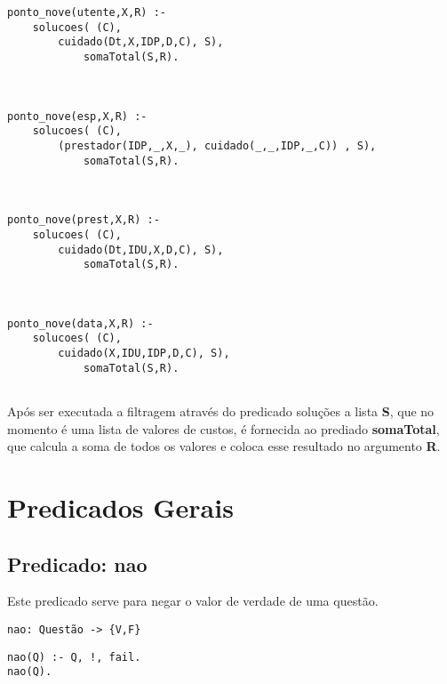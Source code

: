\documentclass{report}
\def\titulo#1{\section{#1}}
\begin{document}
\begin{verbatim}
ponto_nove(utente,X,R) :- 
    solucoes( (C), 
        cuidado(Dt,X,IDP,D,C), S), 
            somaTotal(S,R).



ponto_nove(esp,X,R) :- 
    solucoes( (C), 
        (prestador(IDP,_,X,_), cuidado(_,_,IDP,_,C)) , S), 
            somaTotal(S,R).



ponto_nove(prest,X,R) :- 
    solucoes( (C), 
        cuidado(Dt,IDU,X,D,C), S), 
            somaTotal(S,R). 



ponto_nove(data,X,R) :- 
    solucoes( (C), 
        cuidado(X,IDU,IDP,D,C), S), 
            somaTotal(S,R).


\end{verbatim}

Após ser executada a filtragem através do predicado soluções a lista \textbf{S}, que no momento é uma lista de valores de custos, é fornecida ao prediado \textbf{somaTotal}, que calcula a soma de todos os valores e coloca esse resultado no argumento \textbf{R}.






























\titulo{Predicados Gerais}

\subsection{Predicado: nao}

Este predicado serve para negar o valor de verdade de uma questão.

\begin{verbatim}
nao: Questão -> {V,F}
\end{verbatim}

\begin{verbatim}
nao(Q) :- Q, !, fail.
nao(Q).
\end{verbatim}
\end{document}
